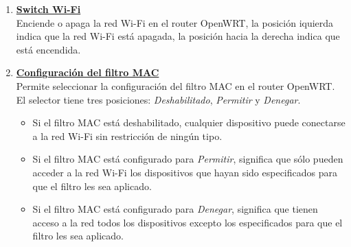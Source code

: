 \documentclass[12pt]{article}
\begin{document}
\begin{enumerate}
            \item \textbf{\underline{Switch Wi-Fi}} \\
            Enciende o apaga la red Wi-Fi en el router OpenWRT, la posición iquierda indica que la red Wi-Fi está apagada, la posición hacia la derecha indica que está encendida.

            \item \textbf{\underline{Configuración del filtro MAC}} \\
            Permite seleccionar la configuración del filtro MAC en el router OpenWRT. El selector tiene tres posiciones: \textit{Deshabilitado}, \textit{Permitir} y \textit{Denegar}.
            \begin{itemize}
                \item Si el filtro MAC está deshabilitado, cualquier dispositivo puede conectarse a la red Wi-Fi sin restricción de ningún tipo.
                \item Si el filtro MAC está configurado para \textit{Permitir}, significa que sólo pueden acceder a la red Wi-Fi los dispositivos que hayan sido especificados para que el filtro les sea aplicado.
                \item Si el filtro MAC está configurado para \textit{Denegar}, significa que tienen acceso a la red todos los dispositivos excepto los especificados para que el filtro les sea aplicado.
            \end{itemize}
            

\end{enumerate}
\end{document}
